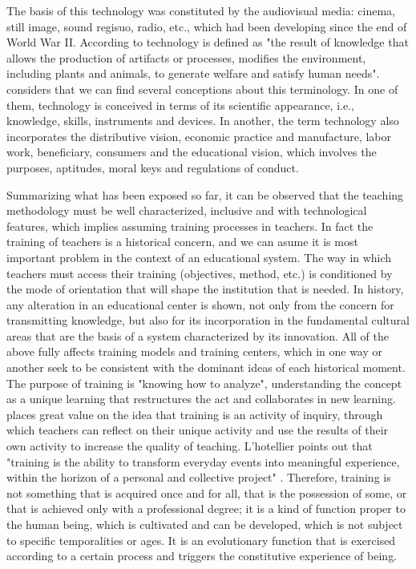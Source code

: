 \documentclass[english]{textolivre}
\begin{document}
The basis of this technology was constituted by the audiovisual media: cinema, still image, sound regisuo, radio, etc., which had been developing since the end of World War II. According to \textcite{jimenez_metodologiinvestigacion_2008} technology is defined as "the result of knowledge that allows the production of artifacts or processes, modifies the environment, including plants and animals, to generate welfare and satisfy human needs". \textcite{nunez_siglo_1999} considers that we can find several conceptions about this terminology. In one of them, technology is conceived in terms of its scientific appearance, i.e., knowledge, skills, instruments and devices. In another, the term technology also incorporates the distributive vision, economic practice and manufacture, labor work, beneficiary, consumers and the educational vision, which involves the purposes, aptitudes, moral keys and regulations of conduct.

Summarizing what has been exposed so far, it can be observed that the teaching methodology must be well characterized, inclusive and with technological features, which implies assuming training processes in teachers. In fact the training of teachers is a historical concern, and we can  asume it is most important problem in the context of an educational system. The way in which teachers must access their training (objectives, method, etc.) is conditioned by the mode of orientation that will shape the institution that is needed. In history, any alteration in an educational center is shown, not only from the concern for transmitting knowledge, but also for its incorporation in the fundamental cultural areas that are the basis of a system characterized by its innovation. All of the above fully affects training models and training centers, which in one way or another seek to be consistent with the dominant ideas of each historical moment. The purpose of training is "knowing how to analyze", understanding the concept as a unique learning that restructures the act and collaborates in new learning. \textcite{stenhouse_investigacion_1987} places great value on the idea that training is an activity of inquiry, through which teachers can reflect on their unique activity and use the results of their own activity to increase the quality of teaching. L'hotellier points out that "training is the ability to transform everyday events into meaningful experience, within the horizon of a personal and collective project" \cite[p. 20]{honore_para_1980}. Therefore, training is not something that is acquired once and for all, that is the possession of some, or that is achieved only with a professional degree; it is a kind of function proper to the human being, which is cultivated and can be developed, which is not subject to specific temporalities or ages. It is an evolutionary function that is exercised according to a certain process and triggers the constitutive experience of being. 
\end{document}
